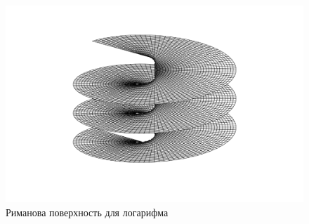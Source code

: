 \documentclass[12pt]{../../notes}
\begin{document}
\begin{figure}[h]
  \centering
  \includegraphics[width=0.8\linewidth]{logrimsurf}
  \caption{Риманова поверхность для логарифма}
  \label{fig:logrimsurf}
\end{figure}




























\end{document}
